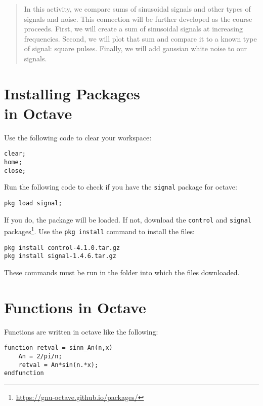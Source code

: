 \documentclass[12pt]{article}
\begin{document}
\twocolumn
\maketitle

\begin{abstract}
In this activity, we compare sums of sinusoidal signals and other types of signals and noise.  This connection will be further developed as the course proceeds.  First, we will create a sum of sinusoidal signals at increasing frequencies.  Second, we will plot that sum and compare it to a known type of signal: square pulses.  Finally, we will add gaussian white noise to our signals.
\end{abstract}

\section{Installing Packages \\ in Octave}

Use the following code to clear your workspace:

\begin{verbatim}
clear;
home;
close;
\end{verbatim}

Run the following code to check if you have the \verb+signal+ package for octave:

\begin{verbatim}
pkg load signal;
\end{verbatim}

If you do, the package will be loaded.  If not, download the \verb+control+ and \verb+signal+ packages\footnote{\url{https://gnu-octave.github.io/packages/}}.  Use the \verb+pkg install+ command to install the files:

\begin{verbatim}
pkg install control-4.1.0.tar.gz
pkg install signal-1.4.6.tar.gz
\end{verbatim}

These commands must be run in the folder into which the files downloaded.

\section{Functions in Octave}

Functions are written in octave like the following:

\begin{verbatim}
function retval = sinn_An(n,x)
    An = 2/pi/n;
    retval = An*sin(n.*x);
endfunction
\end{verbatim}
\end{document}
